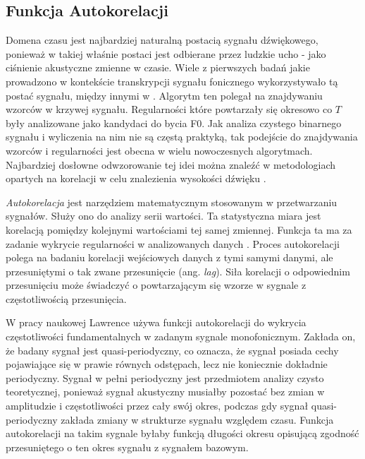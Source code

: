 \documentclass[12pt,a4paper,twoside]{mwart}
\begin{document}
\subsection{Funkcja Autokorelacji}\label{sec:f0:ac}
Domena czasu jest najbardziej naturalną postacią sygnału dźwiękowego, ponieważ w takiej właśnie postaci jest odbierane przez ludzkie ucho - jako ciśnienie akustyczne zmienne w czasie. Wiele z pierwszych badań jakie prowadzono w kontekście transkrypcji sygnału fonicznego wykorzystywało tą postać sygnału, między innymi w \cite{Transcription:Gold:ComputerProgramForPitchExtraction}. Algorytm ten polegał na znajdywaniu wzorców w krzywej sygnału. Regularności które powtarzały się okresowo co $T$ były analizowane jako kandydaci do bycia F0. Jak analiza czystego binarnego sygnału i wyliczenia na nim nie są częstą praktyką, tak podejście do znajdywania wzorców i regularności jest obecna w wielu nowoczesnych algorytmach. Najbardziej dosłowne odwzorowanie tej idei można znaleźć w metodologiach opartych na korelacji w celu znalezienia wysokości dźwięku \cite[41-44]{Transcription:Quenneville:Thesis}.

\textit{Autokorelacja} jest narzędziem matematycznym stosowanym w przetwarzaniu sygnałów. Służy ono do analizy serii wartości. Ta statystyczna miara jest korelacją pomiędzy kolejnymi wartościami tej samej zmiennej. Funkcja ta ma za zadanie wykrycie regularności w analizowanych danych \cite[32-33]{CyfrowePrzetwarzanieSygnalowOdTeoriiDoZastosowan}. Proces autokorelacji polega na badaniu korelacji wejściowych danych z tymi samymi danymi, ale przesuniętymi o tak zwane przesunięcie (ang. \textit{lag}). Siła korelacji o odpowiednim przesunięciu może świadczyć o powtarzającym się wzorze w sygnale z częstotliwością przesunięcia.

W pracy naukowej \cite{Transcription:Lawrence:AutocorrelationForPitchDetection} Lawrence używa funkcji autokorelacji do wykrycia częstotliwości fundamentalnych w zadanym sygnale monofonicznym. Zakłada on, że badany sygnał jest quasi-periodyczny, co oznacza, że sygnał posiada cechy pojawiające się w prawie równych odstępach, lecz nie koniecznie dokładnie periodyczny. Sygnał w pełni periodyczny jest przedmiotem analizy czysto teoretycznej, ponieważ sygnał akustyczny musiałby pozostać bez zmian w amplitudzie i częstotliwości przez cały swój okres, podczas gdy sygnał quasi-periodyczny zakłada zmiany w strukturze sygnału względem czasu. Funkcja autokorelacji na takim sygnale byłaby funkcją długości okresu opisującą zgodność przesuniętego o ten okres sygnału z sygnałem bazowym. 
\end{document}
